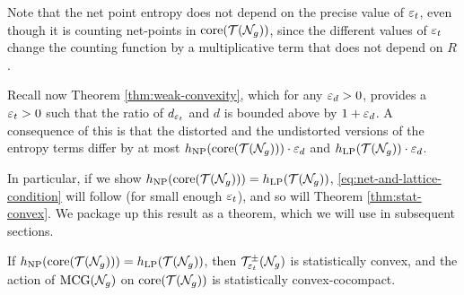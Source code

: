 Note that the net point entropy does not depend on the precise value of $\varepsilon_t$, even though it is counting net-points in $\mathrm{core}(\mathcal{T}(\mathcal{N}_g))$, since the different values of $\varepsilon_t$ change the counting function by a multiplicative term that does not depend on $R$.

Recall now Theorem \ref{thm:weak-convexity}, which for any $\varepsilon_d > 0$, provides a $\varepsilon_t > 0$ such that the ratio of $d_{\varepsilon_t}$ and $d$ is bounded above by $1 + \varepsilon_d$.
A consequence of this is that the distorted and the undistorted versions of the entropy terms differ by at most $h_{\mathrm{NP}}(\mathrm{core}(\mathcal{T}(\mathcal{N}_g))) \cdot \varepsilon_d$ and $h_{\mathrm{LP}}(\mathcal{T}(\mathcal{N}_g)) \cdot \varepsilon_d$.

In particular, if we show $h_{\mathrm{NP}}(\mathrm{core}(\mathcal{T}(\mathcal{N}_g))) = h_{\mathrm{LP}}(\mathcal{T}(\mathcal{N}_g))$, \eqref{eq:net-and-lattice-condition} will follow (for small enough $\varepsilon_t$), and so will Theorem \ref{thm:stat-convex}.
We package up this result as a theorem, which we will use in subsequent sections.

\begin{theorem}
  \label{thm:entropy-equality-implies-scc}
  If $h_{\mathrm{NP}}(\mathrm{core}(\mathcal{T}(\mathcal{N}_g))) = h_{\mathrm{LP}}(\mathcal{T}(\mathcal{N}_g))$, then $\mathcal{T}_{\varepsilon_t}^{\pm}(\mathcal{N}_g)$ is statistically convex, and the action of $\mathrm{MCG}(\mathcal{N}_g)$ on $\mathrm{core}(\mathcal{T}(\mathcal{N}_g))$ is statistically convex-cocompact.
\end{theorem}


